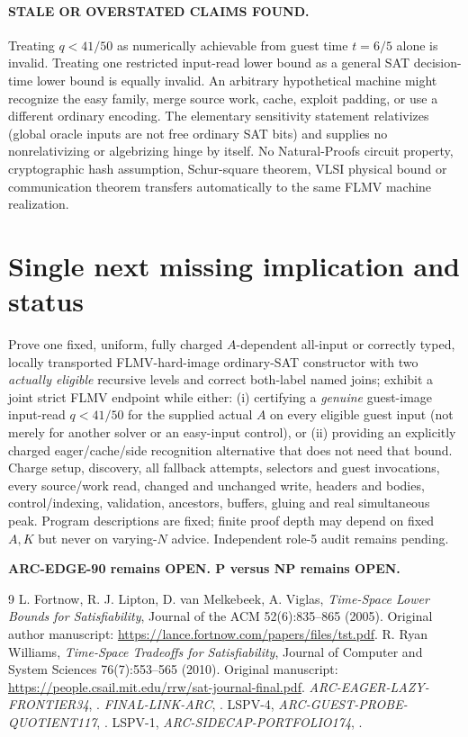 \documentclass[11pt]{article}
\begin{document}
\paragraph{STALE OR OVERSTATED CLAIMS FOUND.}
Treating $q<41/50$ as numerically achievable from
guest time $t=6/5$ alone is invalid.
Treating one restricted input-read lower bound as a
general SAT decision-time lower bound is equally
invalid. An arbitrary hypothetical machine might
recognize the easy family, merge source work,
cache, exploit padding, or use a different
ordinary encoding. The elementary sensitivity
statement relativizes (global oracle inputs
are not free ordinary SAT bits) and supplies no
nonrelativizing or algebrizing hinge by itself.
No Natural-Proofs circuit property, cryptographic
hash assumption, Schur-square theorem, VLSI
physical bound or communication theorem transfers
automatically to the same FLMV machine realization.

\section{Single next missing implication and status}
Prove one fixed, uniform, fully charged $A$-dependent
all-input or correctly typed, locally transported
FLMV-hard-image ordinary-SAT constructor with two
\emph{actually eligible} recursive levels and correct
both-label named joins; exhibit a joint strict
FLMV endpoint while either:
(i) certifying a \emph{genuine} guest-image input-read
$q<41/50$ for the supplied actual $A$ on every eligible
guest input (not merely for another solver or an
easy-input control), or
(ii) providing an explicitly charged eager/cache/side
recognition alternative that does not need that bound.
Charge setup, discovery, all fallback attempts,
selectors and guest invocations, every source/work
read, changed and unchanged write, headers and
bodies, control/indexing, validation, ancestors,
buffers, gluing and real simultaneous peak.
Program descriptions are fixed; finite proof depth
may depend on fixed $A,K$ but never on varying-$N$
advice. Independent role-5 audit remains pending.

\textbf{ARC-EDGE-90 remains OPEN. P versus NP remains OPEN.}

\begin{thebibliography}{9}
 L. Fortnow, R. J. Lipton, D. van Melkebeek,
A. Viglas, \emph{Time-Space Lower Bounds for Satisfiability},
Journal of the ACM 52(6):835--865 (2005).
Original author manuscript:
\url{https://lance.fortnow.com/papers/files/tst.pdf}.
 R. Ryan Williams,
\emph{Time-Space Tradeoffs for Satisfiability},
Journal of Computer and System Sciences 76(7):553--565 (2010).
Original manuscript:
\url{https://people.csail.mit.edu/rrw/sat-journal-final.pdf}.
 \emph{ARC-EAGER-LAZY-FRONTIER34},
.
 \emph{FINAL-LINK-ARC},
.
 LSPV-4, \emph{ARC-GUEST-PROBE-QUOTIENT117},
.
 LSPV-1, \emph{ARC-SIDECAP-PORTFOLIO174},
.
\end{thebibliography}
\end{document}
